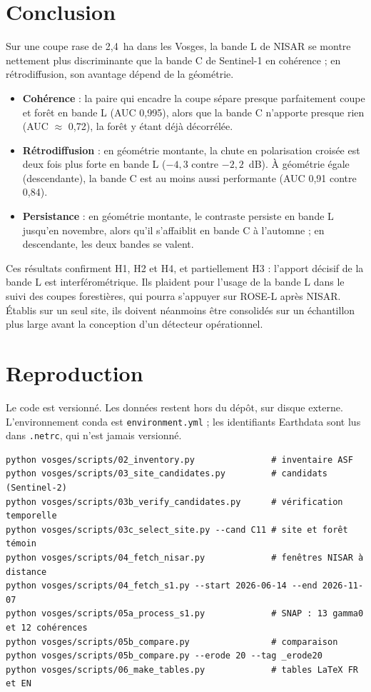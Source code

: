 \documentclass[11pt,a4paper]{article}
\begin{document}
\section{Conclusion}

Sur une coupe rase de 2,4~ha dans les Vosges, la bande L de NISAR se montre nettement plus discriminante que la
bande C de Sentinel-1 en cohérence ; en rétrodiffusion, son avantage dépend de la géométrie.
\begin{itemize}
\item \textbf{Cohérence} : la paire qui encadre la coupe sépare presque parfaitement coupe et forêt en bande L
  (AUC 0,995), alors que la bande C n'apporte presque rien (AUC $\approx$ 0,72), la forêt y étant déjà décorrélée.
\item \textbf{Rétrodiffusion} : en géométrie montante, la chute en polarisation croisée est deux fois plus forte
  en bande L ($-4{,}3$ contre $-2{,}2$~dB). À géométrie égale (descendante), la bande C est au moins aussi
  performante (AUC 0,91 contre 0,84).
\item \textbf{Persistance} : en géométrie montante, le contraste persiste en bande L jusqu'en novembre, alors qu'il
  s'affaiblit en bande C à l'automne ; en descendante, les deux bandes se valent.
\end{itemize}
Ces résultats confirment H1, H2 et H4, et partiellement H3 : l'apport décisif de la bande L est
interférométrique. Ils plaident pour l'usage de la bande L dans le suivi des coupes forestières, qui pourra
s'appuyer sur ROSE-L après NISAR. Établis sur un seul site, ils doivent néanmoins être consolidés sur un
échantillon plus large avant la conception d'un détecteur opérationnel.

\printbibliography[heading=bibintoc,title={Références}]

\appendix
\section{Reproduction}

Le code est versionné. Les données restent hors du dépôt, sur disque externe. L'environnement conda est
\texttt{environment.yml} ; les identifiants Earthdata sont lus dans \texttt{.netrc}, qui n'est jamais versionné.

\begin{verbatim}
python vosges/scripts/02_inventory.py               # inventaire ASF
python vosges/scripts/03_site_candidates.py         # candidats (Sentinel-2)
python vosges/scripts/03b_verify_candidates.py      # vérification temporelle
python vosges/scripts/03c_select_site.py --cand C11 # site et forêt témoin
python vosges/scripts/04_fetch_nisar.py             # fenêtres NISAR à distance
python vosges/scripts/04_fetch_s1.py --start 2026-06-14 --end 2026-11-07
python vosges/scripts/05a_process_s1.py             # SNAP : 13 gamma0 et 12 cohérences
python vosges/scripts/05b_compare.py                # comparaison
python vosges/scripts/05b_compare.py --erode 20 --tag _erode20
python vosges/scripts/06_make_tables.py             # tables LaTeX FR et EN
\end{verbatim}
\end{document}
